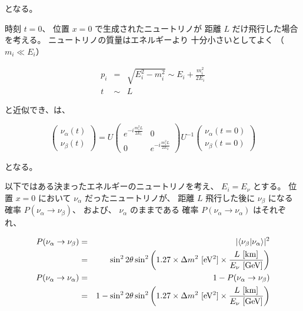 となる。

時刻 $t=0$、
位置 $x=0$ で生成されたニュートリノが
距離 $L$ だけ飛行した場合を考える。
ニュートリノの質量はエネルギーより
十分小さいとしてよく
（$m_{i} \ll E_{i}$）

\begin{eqnarray}
    p_{i} & = & \sqrt{E_{i}^{2}-m_{i}^{2}} \sim E_{i} + \frac{m_{i}^{2}}{2E_{i}}\\
    t & \sim & L
\end{eqnarray}

と近似でき、は、

\begin{equation}
    \begin{pmatrix}
        \nu_{\alpha}(t)\\
        \nu_{\beta}(t)
    \end{pmatrix}
    = U
    \begin{pmatrix}
        e^{-i\frac{m_{1}^{2}L}{2E_{1}}} & 0\\
        0 & e^{-i\frac{m_{1}^{2}L}{2E_{2}}}
    \end{pmatrix}
    U^{-1}
    \begin{pmatrix}
        \nu_{\alpha}(t=0)\\
        \nu_{\beta}(t=0)
    \end{pmatrix}
\end{equation}

となる。

以下ではある決まったエネルギーのニュートリノを考え、
$E_{i} = E_{\nu}$ とする。
位置 $x=0$ において $\nu_{\alpha}$ だったニュートリノが、
距離 $L$ 飛行した後に $\nu_{\beta}$ になる
確率 $P(\nu_{\alpha} \rightarrow \nu_{\beta})$、
および、 $\nu_{\alpha}$ のままである
確率 $P(\nu_{\alpha} \rightarrow \nu_{\alpha})$ はそれぞれ、

\begin{eqnarray}
    P(\nu_{\alpha} \rightarrow \nu_{\beta}) & = & |\bra{\nu_{\beta}}\nu_{\alpha}\rangle|^{2} \nonumber\\
    & = & \sin^{2}2\theta\sin^{2}\left(1.27\times \Delta m^{2}\ \mathrm{[eV^{2}]}\times \frac{L\ \mathrm{[km]}}{E_{\nu}\ \mathrm{[GeV]}}\right) \label{nuchange}\\
    P(\nu_{\alpha} \rightarrow \nu_{\alpha}) & = & 1 - P(\nu_{\alpha}\rightarrow \nu_{\beta}) \nonumber \\
    & = & 1 - \sin^{2}2\theta\sin^{2}\left(1.27 \times \Delta m^{2}\ \mathrm{[eV^{2}]} \times \frac{L\ \mathrm{[km]}}{E_{\nu}\ \mathrm{[GeV]}}\right) \label{nuunchange}
\end{eqnarray}

